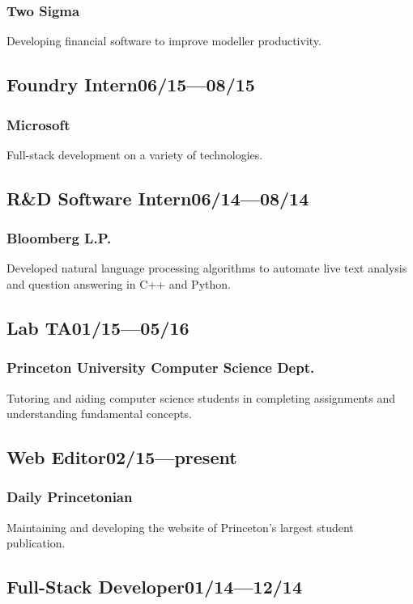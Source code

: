 \documentclass[11pt]{article}
\begin{document}
\begin{multicols}{2}
  \subsubsection*{Two Sigma}
  Developing financial software to improve modeller productivity.

  \subsection*{Foundry Intern\hfill\textnormal{06/15---08/15}}
  \subsubsection*{Microsoft}
  Full-stack development on a variety of technologies.

  \subsection*{R\&D Software Intern\hfill\textnormal{06/14---08/14}}
  \subsubsection*{Bloomberg L.P.}
  Developed natural language processing algorithms to automate live text analysis and question answering in C++ and Python.

  \subsection*{Lab TA\hfill\textnormal{01/15---05/16}}
  \subsubsection*{Princeton University Computer Science Dept.}
  Tutoring and aiding computer science students in completing assignments and understanding fundamental concepts.

  \subsection*{Web Editor\hfill\textnormal{02/15---present}}
  \subsubsection*{Daily Princetonian}
  Maintaining and developing the website of Princeton's largest student publication.

  \subsection*{Full-Stack Developer\hfill\textnormal{01/14---12/14}}

\end{multicols}
\end{document}
